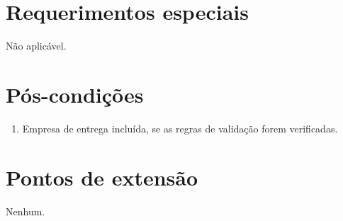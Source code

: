 \section{Requerimentos especiais}

Não aplicável.

\section{Pós-condições}

\begin{enumerate}
	\item Empresa de entrega incluída, se as regras de validação forem verificadas.
\end{enumerate}

\section{Pontos de extensão}

Nenhum.